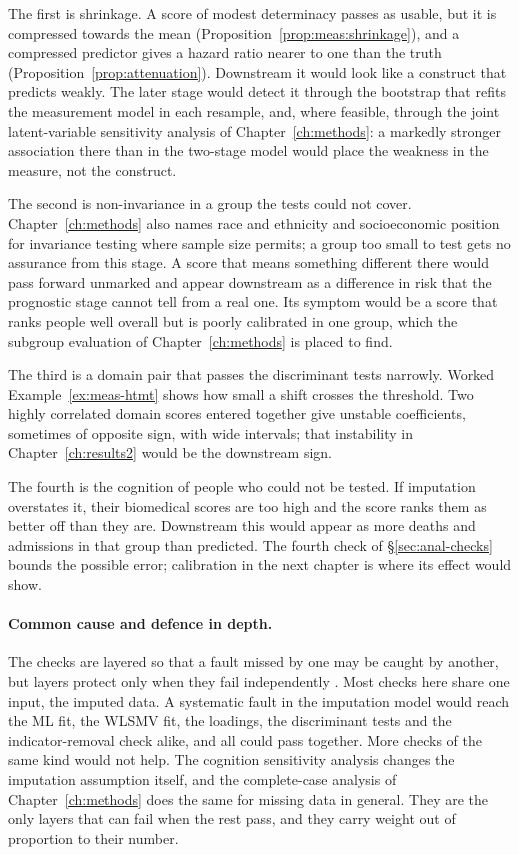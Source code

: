 The first is shrinkage. A score of modest determinacy passes as usable, but it is compressed towards the mean (Proposition~\ref{prop:meas:shrinkage}), and a compressed predictor gives a hazard ratio nearer to one than the truth (Proposition~\ref{prop:attenuation}). Downstream it would look like a construct that predicts weakly. The later stage would detect it through the bootstrap that refits the measurement model in each resample, and, where feasible, through the joint latent-variable sensitivity analysis of Chapter~\ref{ch:methods}: a markedly stronger association there than in the two-stage model would place the weakness in the measure, not the construct.

The second is non-invariance in a group the tests could not cover. Chapter~\ref{ch:methods} also names race and ethnicity and socioeconomic position for invariance testing where sample size permits; a group too small to test gets no assurance from this stage. A score that means something different there would pass forward unmarked and appear downstream as a difference in risk that the prognostic stage cannot tell from a real one. Its symptom would be a score that ranks people well overall but is poorly calibrated in one group, which the subgroup evaluation of Chapter~\ref{ch:methods} is placed to find.

The third is a domain pair that passes the discriminant tests narrowly. Worked Example~\ref{ex:meas-htmt} shows how small a shift crosses the threshold. Two highly correlated domain scores entered together give unstable coefficients, sometimes of opposite sign, with wide intervals; that instability in Chapter~\ref{ch:results2} would be the downstream sign.

The fourth is the cognition of people who could not be tested. If imputation overstates it, their biomedical scores are too high and the score ranks them as better off than they are. Downstream this would appear as more deaths and admissions in that group than predicted. The fourth check of \S\ref{sec:anal-checks} bounds the possible error; calibration in the next chapter is where its effect would show.

\paragraph{Common cause and defence in depth.} The checks are layered so that a fault missed by one may be caught by another, but layers protect only when they fail independently \citep{reason_1990}. Most checks here share one input, the imputed data. A systematic fault in the imputation model would reach the ML fit, the WLSMV fit, the loadings, the discriminant tests and the indicator-removal check alike, and all could pass together. More checks of the same kind would not help. The cognition sensitivity analysis changes the imputation assumption itself, and the complete-case analysis of Chapter~\ref{ch:methods} does the same for missing data in general. They are the only layers that can fail when the rest pass, and they carry weight out of proportion to their number.

